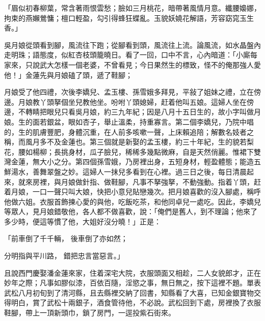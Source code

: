 \begin{showcontents}{}
「眉似初春柳葉，常含著雨恨雲愁；臉如三月桃花，暗帶著風情月意。纖腰嬝娜，拘束的燕嬾鶯慵；檀口輕盈，勾引得蜂狂蝶亂。玉貌妖嬈花解語，芳容窈窕玉生香。」

吳月娘從頭看到腳，風流往下跑；從腳看到頭，風流往上流。論風流，如水晶盤內走明珠；語態度，似紅杏枝頭籠曉日。看了一回，口中不言，心內暗道：「小廝每家來，只說武大怎樣一個老婆，不曾看見；今日果然生的標致，怪不的俺那強人愛他！」金蓮先與月娘磕了頭，遞了鞋腳；

月娘受了他四禮，次後李嬌兒、孟玉樓、孫雪娥多拜見，平敍了姐妹之禮，立在傍邊。月娘教丫頭拏個坐兒教他坐。吩咐丫頭媳婦，赶着他叫五娘。這婦人坐在傍邊，不轉睛把眼兒只看吳月娘，約三九年紀；因是八月十五日生的，故小字叫做月娘。生的面若銀盆，眼如杏子，舉止溫柔，持重寡言。第二個李嬌兒，乃院中唱的，生的肌膚豐肥，身體沉重，在人前多咳嗽一聲，上床賴追陪；解數名妓者之稱，而風月多不及金蓮也。第三個就是新娶的孟玉樓，約三十年紀，生的貌若梨花，腰如楊柳；長挑身材，瓜子臉兒，稀稀多幾點微麻，自是天然俏麗。惟裙下雙灣金蓮，無大小之分。第四個孫雪娥，乃房裡出身，五短身材，輕盈體態；能造五鮮湯水，善舞翠盤之妙。這婦人一抹兒多看到在心裡。過三日之後，每日清晨起來，就來房裡，與月娘做針指、做鞋腳，凡事不拏強拏，不動強動。指着丫頭，赶着月娘，一口一聲只叫大娘，快把小意兒貼戀幾次。把月娘喜歡的沒入腳處，稱呼他做六姐。衣服首飾揀心愛的與他，吃飯吃茶，和他同卓兒一處吃。因此，李嬌兒等眾人，見月娘錯敬他，各人都不做喜歡，說：「俺們是舊人，到不理論；他來了多少時，便這等慣了他，大姐好沒分曉！」正是：

「前車倒了千千輛，  後車倒了亦如然；

分明指與平川路，  錯把忠言當惡言。」

且說西門慶娶潘金蓮來家，住着深宅大院，衣服頭面又相趁，二人女貌郎才，正在妙年之際；凡事如膠似漆，百依百隨，淫慾之事，無日無之，按下這裡不題。單表武松八月初旬到了清河縣，且去縣裡交納了回書，知縣看了大喜，已知金銀寶物交得明白，賞了武松十兩銀子，酒食管待他，不必說。武松回到下處，房裡換了衣服鞋腳，帶上一頂新頭巾，鎖了房門，一逕投紫石街來。


\end{showcontents}
